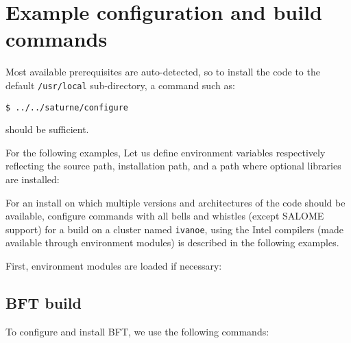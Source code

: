 \documentclass[a4paper,10pt,twoside]{article}
\begin{document}
\section{Example configuration and build commands\label{sec:config:examples}}

Most available prerequisites are auto-detected, so to install the
code to the default \texttt{/usr/local} sub-directory,
a command such as:

\texttt{\$ ../../saturne/configure}

should be sufficient.

For the following examples, Let us define environment variables respectively
reflecting the \CS source path, installation path, and a path where optional
libraries are installed:


For an install on which multiple
versions and architectures of the code should be available,
configure commands with all bells and whistles (except SALOME support) for a
build on a cluster named \texttt{ivanoe}, using the Intel compilers
(made available through environment modules) is described in the following
examples.

First, environment modules are loaded if necessary:


\subsection{BFT build\label{sec:bft:config:examples}}

To configure and install BFT, we use the following commands:
\end{document}

